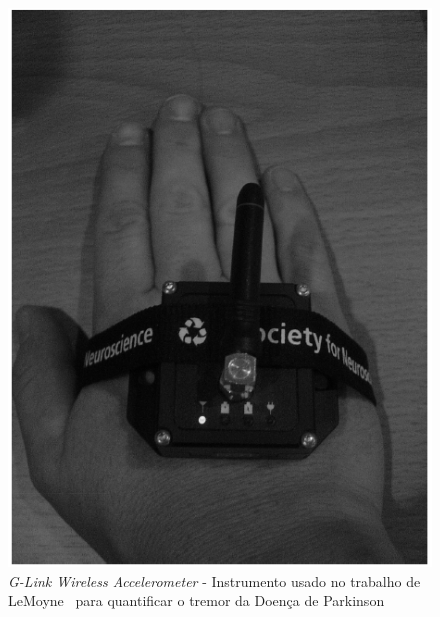 \begin{figure}
 \centering
 \includegraphics[scale=0.3]{./img/quantif-parkinson.png}
\caption[\textit{G-Link Wireless Accelerometer} - Instrumento usado no trabalho de LeMoyne para quantificar o tremor da Doença de Parkinson]{\textit{G-Link Wireless Accelerometer} - Instrumento usado no trabalho de LeMoyne~\cite{LeMoyne2009} para quantificar o tremor da Doença de Parkinson} 
 \label{fig:quantif-parkinson}
\end{figure}

